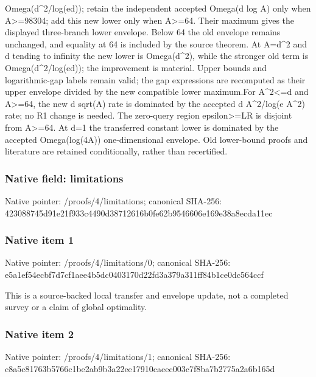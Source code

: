 \documentclass[10pt,a4paper]{article}
\begin{document}
Omega(d\textasciicircum{}2/\allowbreak{}log(ed));\allowbreak{} retain the independent accepted Omega(d log A) only when A>=\allowbreak{}98304;\allowbreak{} add this new lower only when A>=\allowbreak{}64. Their maximum gives the displayed three-branch lower envelope. Below 64 the old envelope remains unchanged,\allowbreak{} and equality at 64 is included by the source theorem. At A=\allowbreak{}d\textasciicircum{}2 and d tending to infinity the new lower is Omega(d\textasciicircum{}2),\allowbreak{} while the stronger old term is Omega(d\textasciicircum{}2/\allowbreak{}log(ed));\allowbreak{} the improvement is material. Upper bounds and logarithmic-gap labels remain valid;\allowbreak{} the gap expressions are recomputed as their upper envelope divided by the new compatible lower maximum.\newline{}\newline{}For A\textasciicircum{}2<=\allowbreak{}d and A>=\allowbreak{}64,\allowbreak{} the new d sqrt(A) rate is dominated by the accepted d A\textasciicircum{}2/\allowbreak{}log(e A\textasciicircum{}2) rate;\allowbreak{} no R1 change is needed. The zero-query region epsilon>=\allowbreak{}LR is disjoint from A>=\allowbreak{}64. At d=\allowbreak{}1 the transferred constant lower is dominated by the accepted Omega(log(4A)) one-dimensional envelope. Old lower-bound proofs and literature are retained conditionally,\allowbreak{} rather than recertified.\par\endgroup

\subsubsection{Native field: limitations}
Native pointer: /proofs/4/limitations; canonical SHA-256: 423088745d91e21f933c4490d38712616b0fe62b9546606e169e38a8ecda11ec

\subsubsection{Native item 1}
Native pointer: /proofs/4/limitations/0; canonical SHA-256: e5a1ef54ecbf7d7cf1aee4b5dc0403170d22fd3a379a311ff84b1ce0dc564ccf

\begingroup\raggedright\sloppy This is a source-backed local transfer and envelope update,\allowbreak{} not a completed survey or a claim of global optimality.\par\endgroup

\subsubsection{Native item 2}
Native pointer: /proofs/4/limitations/1; canonical SHA-256: c8a5c81763b5766c1be2ab9b3a22ee17910caeec003c7f8ba7b2775a2a6b165d
\end{document}
